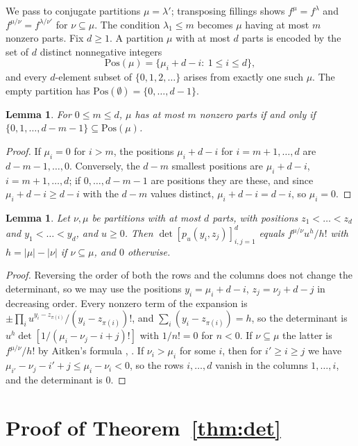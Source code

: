 \documentclass[11pt]{amsart}
\newtheorem{lemma}[theorem]{Lemma}
\theoremstyle{remark}
\numberwithin{equation}{section}
\begin{document}
We pass to conjugate partitions $\mu=\lambda'$; transposing fillings shows $f^{\mu}=f^{\lambda}$ and $f^{\mu/\nu}=f^{\lambda/\nu'}$ for $\nu\subseteq\mu$. The condition $\lambda_1\le m$ becomes $\mu$ having at most $m$ nonzero parts. Fix $d\ge1$. A partition $\mu$ with at most $d$ parts is encoded by the set of $d$ distinct nonnegative integers
\[
\mathrm{Pos}(\mu)=\{\mu_i+d-i:\ 1\le i\le d\},
\]
and every $d$-element subset of $\{0,1,2,\dots\}$ arises from exactly one such $\mu$. The empty partition has $\mathrm{Pos}(\emptyset)=\{0,\dots,d-1\}$.

\begin{lemma}\label{lem:occ}
For $0\le m\le d$, $\mu$ has at most $m$ nonzero parts if and only if $\{0,1,\dots,d-m-1\}\subseteq\mathrm{Pos}(\mu)$.
\end{lemma}

\begin{proof}
If $\mu_i=0$ for $i>m$, the positions $\mu_i+d-i$ for $i=m+1,\dots,d$ are $d-m-1,\dots,0$. Conversely, the $d-m$ smallest positions are $\mu_i+d-i$, $i=m+1,\dots,d$; if $0,\dots,d-m-1$ are positions they are these, and since $\mu_i+d-i\ge d-i$ with the $d-m$ values distinct, $\mu_i+d-i=d-i$, so $\mu_i=0$.
\end{proof}

\begin{lemma}\label{lem:aitken}
Let $\nu,\mu$ be partitions with at most $d$ parts, with positions $z_1<\dots<z_d$ and $y_1<\dots<y_d$, and $u\ge0$. Then $\det[p_u(y_i,z_j)]_{i,j=1}^d$ equals $f^{\mu/\nu}u^h/h!$ with $h=|\mu|-|\nu|$ if $\nu\subseteq\mu$, and $0$ otherwise.
\end{lemma}

\begin{proof}
Reversing the order of both the rows and the columns does not change the determinant, so we may use the positions $y_i=\mu_i+d-i$, $z_j=\nu_j+d-j$ in decreasing order. Every nonzero term of the expansion is $\pm\prod_iu^{y_i-z_{\pi(i)}}/(y_i-z_{\pi(i)})!$, and $\sum_i(y_i-z_{\pi(i)})=h$, so the determinant is $u^h\det[1/(\mu_i-\nu_j-i+j)!]$ with $1/n!=0$ for $n<0$. If $\nu\subseteq\mu$ the latter is $f^{\mu/\nu}/h!$ by Aitken's formula \cite{Ait43}, \cite[Section~7.16]{Sta99}. If $\nu_i>\mu_i$ for some $i$, then for $i'\ge i\ge j$ we have $\mu_{i'}-\nu_j-i'+j\le\mu_i-\nu_i<0$, so the rows $i,\dots,d$ vanish in the columns $1,\dots,i$, and the determinant is $0$.
\end{proof}

\section{Proof of Theorem~\ref{thm:det}}\label{sec:det}
\end{document}
